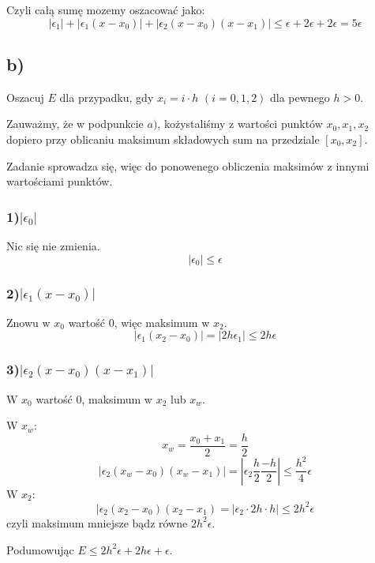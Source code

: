 \documentclass{article}
\begin{document}
Czyli całą sumę mozemy oszacować jako:
$$|\epsilon_1| + |\epsilon_1(x-x_0)| + |\epsilon_2(x-x_0)(x-x_1)| \le \epsilon + 2\epsilon + 2\epsilon = 5\epsilon  $$

\newpage

\subsection*{b)}
Oszacuj $E$ dla przypadku, gdy $x_i=i⋅h$ $(i=0,1,2)$ dla pewnego $h>0$.

Zauważmy, że w podpunkcie $a)$, kożystaliśmy z wartości punktów $x_0, x_1, x_2$ dopiero przy oblicaniu maksimum składowych sum na przedziale $[x_0, x_2]$.

Zadanie sprowadza się, więc do ponowenego obliczenia maksimów z innymi wartościami punktów.

\subsubsection*{1)$|\epsilon_0|$}
Nic się nie zmienia.
$$|\epsilon_0| \le \epsilon$$

\subsubsection*{2)$|\epsilon_1(x-x_0)|$}
Znowu w $x_0$ wartość $0$, więc maksimum w $x_2$.
$$|\epsilon_1(x_2-x_0)| = |2h\epsilon_1| \le 2h\epsilon$$

\subsubsection*{3)$|\epsilon_2(x-x_0)(x-x_1)|$}
W $x_0$ wartość 0, maksimum w $x_2$ lub $x_w$.

W $x_w$:
$$ x_w = \frac{x_0+x_1}{2} = \frac{h}{2}$$
$$|\epsilon_2(x_w-x_0)(x_w-x_1)| = \left| \epsilon_2\frac{h}{2}\frac{-h}{2} \right| \le \frac{h^2}{4}\epsilon$$
W $x_2$:
$$|\epsilon_2(x_2-x_0)(x_2-x_1) = |\epsilon_2\cdot2h\cdot h| \le 2h^2\epsilon$$
czyli maksimum mniejsze bądz równe $2h^2\epsilon$.

Podumowując $E \le 2h^2\epsilon + 2h\epsilon + \epsilon$.
\end{document}
